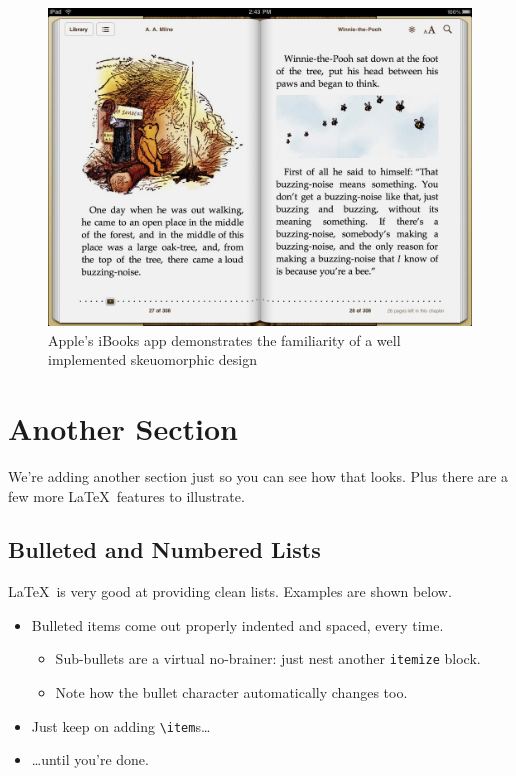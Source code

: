 \documentclass{article}
\begin{document}
\begin{figure}
\centering
\includegraphics[width=5in]{iBooks.jpg} 

\caption{Apple's iBooks app demonstrates the familiarity of a well implemented skeuomorphic design}
\label{ibooks}
\end{figure}


\section{Another Section}

We're adding another section just so you can see how that looks.  Plus there are a few more \LaTeX\ features to illustrate.

\subsection{Bulleted and Numbered Lists}

\LaTeX\ is very good at providing clean lists.  Examples are shown below.

\begin{itemize}
\item Bulleted items come out properly indented and spaced, every time.

\begin{itemize}
\item Sub-bullets are a virtual no-brainer: just nest another \verb!itemize! block.
\item Note how the bullet character automatically changes too.
\end{itemize}

\item Just keep on adding \verb!\item!s\ldots

\item \ldots until you're done.
\end{itemize}
\end{document}

